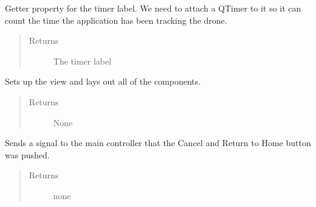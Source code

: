 \documentclass[letterpaper,10pt,english]{sphinxmanual}
\begin{document}
\begin{fulllineitems}
\begin{fulllineitems}
\begin{quote}
\begin{description}
\end{description}\end{quote}

\end{fulllineitems}


\begin{fulllineitems}
\label{\detokenize{index:src.Views.View_LoadingScreen.LoadingWindow.del_LblStatus}}
Getter property for the timer label. We need to attach a QTimer to it so it can count the time the
application has been tracking the drone.
\begin{quote}\begin{description}
\item[{Returns}] \leavevmode
The timer label

\end{description}\end{quote}

\end{fulllineitems}


\begin{fulllineitems}
\label{\detokenize{index:src.Views.View_LoadingScreen.LoadingWindow.initView}}
Sets up the view and lays out all of the components.
\begin{quote}\begin{description}
\item[{Returns}] \leavevmode
None

\end{description}\end{quote}

\end{fulllineitems}


\begin{fulllineitems}
\label{\detokenize{index:src.Views.View_LoadingScreen.LoadingWindow.returnHome}}
Sends a signal to the main controller that the Cancel and Return to Home button was pushed.
\begin{quote}\begin{description}
\item[{Returns}] \leavevmode
none


\end{description}
\end{quote}
\end{fulllineitems}
\end{fulllineitems}
\end{document}
